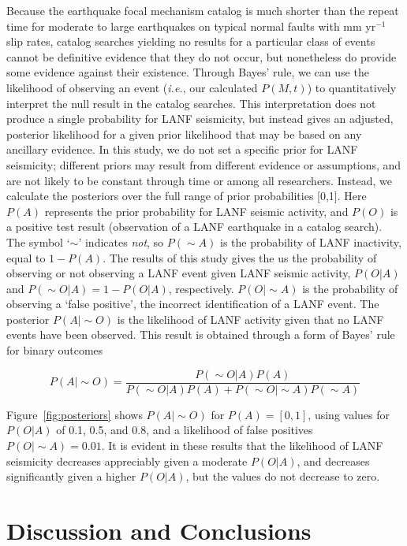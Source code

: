 \documentclass[twocolumn,grl]{AGUTeX}
\begin{document}
\begin{article}
Because the earthquake focal mechanism catalog is much shorter than the repeat
time for moderate to large earthquakes on typical normal faults with mm
yr$^{-1}$ slip rates, catalog searches yielding no results for a particular
class of events cannot be definitive evidence that they do not occur, but
nonetheless do provide some evidence against their existence. Through Bayes'
rule, we can use the likelihood of observing an event (\emph{i.e.}, our
calculated $P(M,t)$) to quantitatively interpret the null result in the catalog
searches. This interpretation does not produce a single probability for LANF
seismicity, but instead gives an adjusted, posterior likelihood for a given
prior likelihood that may be based on any ancillary evidence.  In this study,
we do not set a specific prior for LANF seismicity; different priors may result
from different evidence or assumptions, and are not likely to be constant
through time or among all researchers.  Instead, we calculate the posteriors
over the full range of prior probabilities [0,1]. Here $P(A)$ represents the
prior probability for LANF seismic activity, and $P(O)$ is a positive test
result (observation of a LANF earthquake in a catalog search).  The symbol
`$\sim$' indicates \emph{not}, so $P(\sim A)$ is the probability of LANF
inactivity, equal to $ 1 - P(A)$.  The results of this study gives the us the
probability of observing or not observing a LANF event given LANF seismic
activity, $P(O|A)$ and $P(\sim O | A) = 1 - P(O|A)$, respectively. $P(O | \sim
A)$ is the probability of observing a `false positive', the incorrect
identification of a LANF event.  The posterior $P(A |\sim O)$ is the likelihood
of LANF activity given that no LANF events have been observed.  This result is
obtained through a form of Bayes' rule for binary outcomes

\begin{equation}
P(A | \sim O) = \frac{P(\sim O|A) P(A)}
{P(\sim O|A)P(A) + P(\sim O|\sim A)P(\sim A)}
\label{BayesRule}
\end{equation}

Figure~\ref{fig:posteriors} shows $P(A|\sim O)$ for $P(A) = [0,1]$,
using values for $P(O|A)$ of 0.1, 0.5, and 0.8, and a likelihood of false positives $P(O|\sim A)= 0.01$. It is evident in these results that the likelihood of LANF seismicity decreases appreciably given a moderate $P(O|A)$, and decreases significantly given a higher $P(O|A)$, but the values do not decrease to zero.


\section{Discussion and Conclusions}


\end{article}
\end{document}
